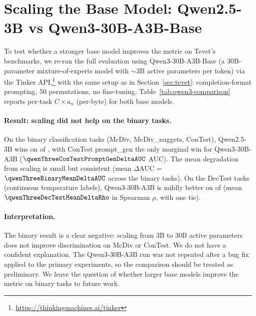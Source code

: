 \section{Scaling the Base Model: Qwen2.5-3B vs Qwen3-30B-A3B-Base}\label{app:qwen3-comparison}

To test whether a stronger base model improves the metric on Tevet's benchmarks, we re-ran the full evaluation using Qwen3-30B-A3B-Base \citep{yang2025qwen3} (a 30B-parameter mixture-of-experts model with $\sim$3B active parameters per token) via the Tinker API,\footnote{\url{https://thinkingmachines.ai/tinker}} with the same setup as in Section~\ref{sec:tevet}: completion-format prompting, 50 permutations, no fine-tuning.
Table~\ref{tab:qwen3-comparison} reports per-task $C \times a_n$ (per-byte) for both base models.

\begin{table}[!t]
\centering
\caption{Per-task comparison of $C \times a_n$ (per-byte) for Qwen2.5-3B vs Qwen3-30B-A3B-Base on Tevet diversity-eval. $\Delta$AUC is positive when the larger model wins.
ROC AUC is reported for the binary tasks (McDiv, McDiv\_nuggets, ConTest); only Spearman $\rho$ is meaningful for DecTest (continuous temperature labels).}
\label{tab:qwen3-comparison}
\small

\end{table}

\paragraph{Result: scaling did not help on the binary tasks.} On the \qwenThreeBinaryTotal{} binary classification tasks (McDiv, McDiv\_nuggets, ConTest), Qwen2.5-3B wins on \qwenThreeBinaryWinsQwenTwoFive{} of \qwenThreeBinaryTotal{}, with ConTest prompt\_gen the only marginal win for Qwen3-30B-A3B ($\qwenThreeConTestPromptGenDeltaAUC$ AUC).
The mean degradation from scaling is small but consistent (mean $\Delta$AUC = $\qwenThreeBinaryMeanDeltaAUC$ across the \qwenThreeBinaryTotal{} binary tasks).
On the \qwenThreeDecTestTotal{} DecTest tasks (continuous temperature labels), Qwen3-30B-A3B is mildly better on \qwenThreeDecTestWins{} of \qwenThreeDecTestTotal{} (mean $\qwenThreeDecTestMeanDeltaRho$ in Spearman $\rho$, with one tie).

\paragraph{Interpretation.} The binary result is a clear negative: scaling from 3B to 30B active parameters does not improve discrimination on McDiv or ConTest.
We do not have a confident explanation.
The Qwen3-30B-A3B run was not repeated after a bug fix applied to the primary experiments, so the comparison should be treated as preliminary.
We leave the question of whether larger base models improve the metric on binary tasks to future work.
